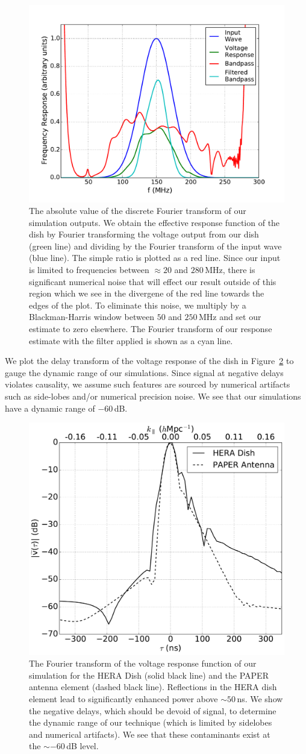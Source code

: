 \documentclass[twocolumn]{emulateapj}
\begin{document}
\begin{figure}[h!]
\includegraphics[width=.5\textwidth]{figures/frequency_domain.pdf}
\caption{The absolute value of the discrete Fourier transform of our simulation outputs. We obtain the effective response function of the dish by Fourier transforming the voltage output from our dish (green line) and dividing by the Fourier transform of the input wave (blue line). The simple ratio is plotted as a red line. Since our input is limited to frequencies between $\approx 20$ and $280$\,MHz, there is significant numerical noise that will effect our result outside of this region which we see in the divergene of the red line towards the edges of the plot. To eliminate this noise, we multiply by a Blackman-Harris window between $50$ and $250$\,MHz and set our estimate to zero elsewhere. The Fourier transform of our response estimate with the filter applied is shown as a cyan line.}
\label{fig:FrequencyDomain}
\end{figure}

We plot the delay transform of the voltage response of the dish in Figure~\ref{fig:Simulations} to gauge the dynamic range of our simulations. Since signal at negative delays violates causality, we assume such features are sourced by numerical artifacts such as side-lobes and/or numerical precision noise. We see that our simulations have a dynamic range of $-60$\,dB.


\begin{figure}[h!]
\includegraphics[width=.5\textwidth]{figures/compare_simulations_paper.pdf}
\caption{The Fourier transform of the voltage response function of our simulation for the HERA Dish (solid black line) and the PAPER antenna element (dashed black line). Reflections in the HERA dish element lead to significantly enhanced power above $\sim 50$\,ns. We show the negative delays, which should be devoid of signal, to determine the dynamic range of our technique (which is limited by sidelobes and numerical artifacts). We see that these contaminants exist at the $\sim-60$\,dB level.}
\label{fig:Simulations}
\end{figure}
\end{document}
